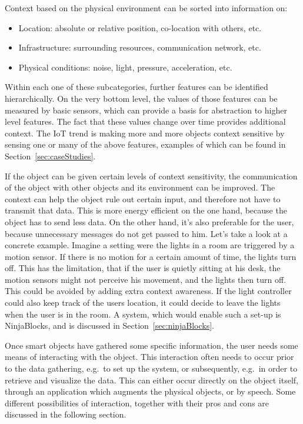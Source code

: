 Context based on the physical environment can be sorted into information on:
\begin{itemize}
	\item Location: absolute or relative position, co-location with others, etc.
	\item Infrastructure: surrounding resources, communication network, etc.
	\item Physical conditions: noise, light, pressure, acceleration, etc.
\end{itemize}

Within each one of these subcategories, further features can be identified hierarchically. 
On the very bottom level, the values of those features can be measured by basic sensors, which can provide a basis for abstraction to higher level features. 
The fact that these values change over time provides additional context. 
The IoT trend is making more and more objects context sensitive by sensing one or many of the above features, examples of which can be found in Section~\ref{sec:caseStudies}.

If the object can be given certain levels of context sensitivity, the communication of the object with other objects and its environment can be improved.
The context can help the object rule out certain input, and therefore not have to transmit that data.
This is more energy efficient on the one hand, because the object has to send less data.
On the other hand, it's also preferable for the user, because unnecessary messages do not get passed to him.
Let's take a look at a concrete example.
Imagine a setting were the lights in a room are triggered by a motion sensor.
If there is no motion for a certain amount of time, the lights turn off.
This has the limitation, that if the user is quietly sitting at his desk, the motion sensors might not perceive his movement, and the lights then turn off.
This could be avoided by adding extra context awareness.
If the light controller could also keep track of the users location, it could decide to leave the lights when the user is in the room.
A system, which would enable such a set-up is NinjaBlocks, and is discussed in Section~\ref{sec:ninjaBlocks}.


Once smart objects have gathered some specific information, the user needs some means of interacting with the object.
This interaction often needs to occur prior to the data gathering, e.g.\ to set up the system, or subsequently, e.g.\ in order to retrieve and visualize the data. This can either occur directly on the object itself, through an application which augments the physical objects, or by speech.
Some different possibilities of interaction, together with their pros and cons are discussed in the following section.

